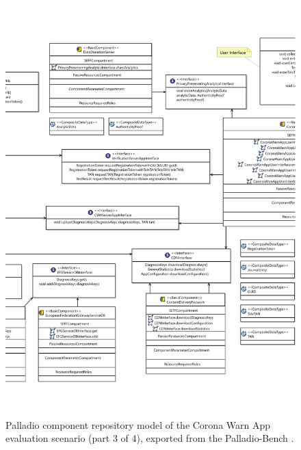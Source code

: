 \begin{figure}
    \centering
    \includegraphics[width=\textwidth]{figures/chapter12/cwa3.pdf}
    \caption[Palladio component repository model of the Corona Warn App evaluation scenario (part 3 of 4).]{Palladio component repository model of the Corona Warn App evaluation scenario (part 3 of 4), exported from the Palladio-Bench \cite{reussner_palladio_2024}.}
    \label{fig:appendix:cwa:3}
\end{figure}

